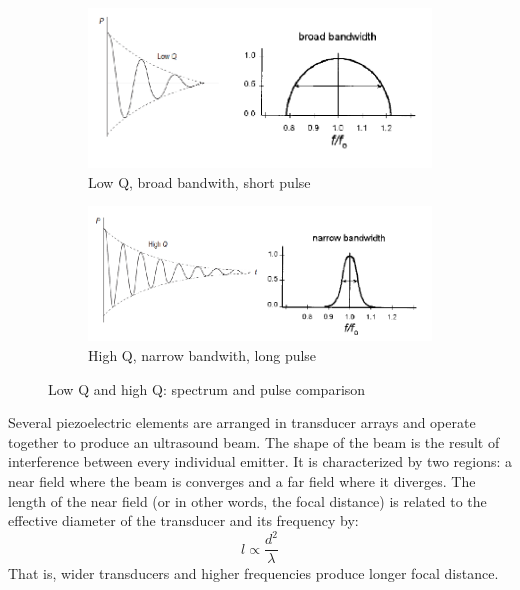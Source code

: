 \documentclass[11pt]{article} %
\begin{document}
	\begin{figure}
	\centering
		\begin{subfigure}{0.49\textwidth}
		\centering
		\includegraphics[width=\textwidth]{figuras/lowq.png}
		\caption{Low Q, broad bandwith, short pulse}
		\end{subfigure}
		\centering
		\begin{subfigure}{0.49\textwidth}
		\centering
		\includegraphics[width=\textwidth]{figuras/highq.png}
		\caption{High Q, narrow bandwith, long pulse}
		\end{subfigure}	
	\caption{Low Q and high Q: spectrum and pulse comparison\cite{bushberg}\cite{farr}}	
	\end{figure}

	
	Several piezoelectric elements are arranged in transducer arrays and operate together to produce an ultrasound beam. The shape of the beam is the result of interference between every individual emitter. It is characterized by two regions: a near field where the beam is converges and a far field where it diverges. The length of the near field (or in other words, the focal distance) is related to the effective diameter of the transducer and its frequency by: \[ l \propto \frac{d^2}{\lambda} \] That is, wider transducers and higher frequencies produce longer focal distance.

	
\end{document}
